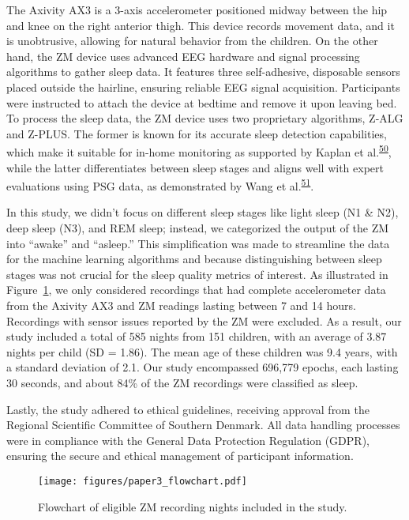 \documentclass[
  10pt,
]{scrbook}
\begin{document}
The Axivity AX3 is a 3-axis accelerometer positioned midway between the
hip and knee on the right anterior thigh. This device records movement
data, and it is unobtrusive, allowing for natural behavior from the
children. On the other hand, the ZM device uses advanced EEG hardware
and signal processing algorithms to gather sleep data. It features three
self-adhesive, disposable sensors placed outside the hairline, ensuring
reliable EEG signal acquisition. Participants were instructed to attach
the device at bedtime and remove it upon leaving bed. To process the
sleep data, the ZM device uses two proprietary algorithms, Z-ALG and
Z-PLUS. The former is known for its accurate sleep detection
capabilities, which make it suitable for in-home monitoring as supported
by Kaplan et
al.\textsuperscript{\protect\hyperlink{ref-kaplan_performance_2014}{50}},
while the latter differentiates between sleep stages and aligns well
with expert evaluations using PSG data, as demonstrated by Wang et
al.\textsuperscript{\protect\hyperlink{ref-wang_evaluation_2015}{51}}.

In this study, we didn't focus on different sleep stages like light
sleep (N1 \& N2), deep sleep (N3), and REM sleep; instead, we
categorized the output of the ZM into ``awake'' and ``asleep.'' This
simplification was made to streamline the data for the machine learning
algorithms and because distinguishing between sleep stages was not
crucial for the sleep quality metrics of interest. As illustrated in
Figure~\ref{fig-paper3_flow}, we only considered recordings that had
complete accelerometer data from the Axivity AX3 and ZM readings lasting
between 7 and 14 hours. Recordings with sensor issues reported by the ZM
were excluded. As a result, our study included a total of 585 nights
from 151 children, with an average of 3.87 nights per child (SD = 1.86).
The mean age of these children was 9.4 years, with a standard deviation
of 2.1. Our study encompassed 696,779 epochs, each lasting 30 seconds,
and about 84\% of the ZM recordings were classified as sleep.

Lastly, the study adhered to ethical guidelines, receiving approval from
the Regional Scientific Committee of Southern Denmark. All data handling
processes were in compliance with the General Data Protection Regulation
(GDPR), ensuring the secure and ethical management of participant
information.

\begin{figure}

{\centering \texttt{[image: figures/paper3\_flowchart.pdf]}

}

\caption{\label{fig-paper3_flow}Flowchart of eligible ZM recording
nights included in the study.}

\end{figure}
\end{document}
